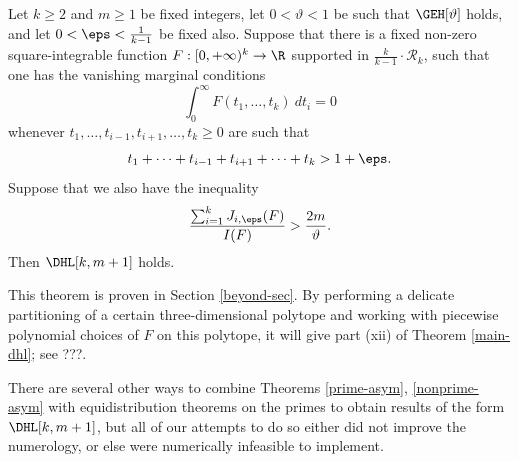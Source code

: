 \begin{theorem}\label{epsilon-beyond}  Let $k \geq 2$ and $m \geq 1$ be fixed integers, let $0 <\vartheta < 1$ be such that $\GEH[\vartheta]$ holds, and let $0 < \eps < \frac{1}{k-1}$ be fixed also. Suppose that there is a fixed non-zero square-integrable function $F: [0,+\infty)^k \to \R$ supported in $\frac{k}{k-1} \cdot {\mathcal R}_k$, such that one has the vanishing marginal conditions
\begin{equation}\label{vanishing-marginal}
\int_0^\infty F(t_1,\dots,t_k)\ dt_i = 0
\end{equation}
whenever $t_1,\dots,t_{i-1},t_{i+1},\dots,t_k \geq 0$ are such that
$$ t_1+\dots+t_{i-1}+t_{i+1}+\dots+t_k > 1+\eps.$$
Suppose that we also have the inequality
$$ \frac{\sum_{i=1}^k J_{i,\eps}(F)}{I(F)} > \frac{2m}{\vartheta}.$$
Then $\DHL[k,m+1]$ holds.
\end{theorem}

This theorem is proven in Section \ref{beyond-sec}.  By performing a delicate partitioning of a certain three-dimensional polytope and working with piecewise polynomial choices of $F$ on this polytope, it will give part (xii) of Theorem \ref{main-dhl}; see ???.

There are several other ways to combine Theorems \ref{prime-asym}, \ref{nonprime-asym} with equidistribution theorems on the primes to obtain results of the form $\DHL[k,m+1]$, but all of our attempts to do so either did not improve the numerology, or else were numerically infeasible to implement.